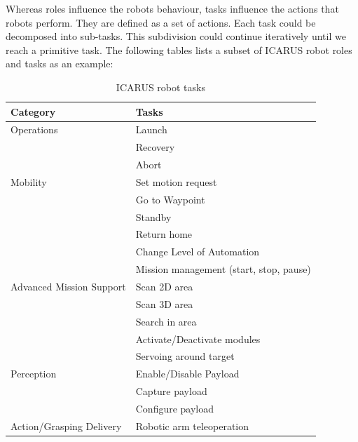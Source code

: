 \documentclass{article}
\begin{document}
Whereas roles influence the robots behaviour, tasks influence the actions that robots perform. They are defined as a set of actions. Each task could be decomposed into sub-tasks. This subdivision could continue iteratively until we reach a primitive task. The following tables lists a subset of ICARUS robot roles and tasks as an example:
\begin{table}[h!]
\centering
\begin{tabular}{| l | l | }
\hline
Category   & Tasks      \\ \hline
Operations & Launch	  \\ \hline
		   & Recovery \\ \hline
		   & Abort    \\ \hline
Mobility   & Set motion request \\ \hline
		   & Go to Waypoint     \\ \hline
		   & Standby            \\ \hline
		   & Return home        \\ \hline 	
  		   & Change Level of Automation \\ \hline 	
  		   & Mission management (start, stop, pause) \\ \hline 		
Advanced Mission Support & Scan 2D area  \\ \hline
		   & Scan 3D area                \\ \hline
		   & Search in area              \\ \hline
		   & Activate/Deactivate modules \\ \hline 	
  		   & Servoing around target      \\ \hline 	
Perception & Enable/Disable Payload      \\ \hline
		   & Capture payload             \\ \hline
		   & Configure payload           \\ \hline
Action/Grasping	Delivery & Robotic arm teleoperation \\ \hline  	
\end{tabular}
\caption{ICARUS robot tasks}
\label{table:robottasks}
\end{table}

\afterpage{\clearpage}
\end{document}
